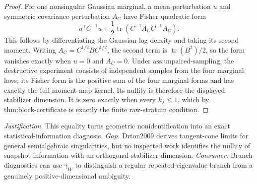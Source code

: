 \documentclass{article}
\begin{document}
\begin{proof}
For one nonsingular Gaussian marginal, a mean perturbation \(u\) and symmetric covariance perturbation \(A_C\) have Fisher quadratic form
\[
 u^{\mathsf T}C^{-1}u+
 \frac12\operatorname{tr}(C^{-1}A_CC^{-1}A_C).
\]
This follows by differentiating the Gaussian log density and taking its second moment.  Writing \(A_C=C^{1/2}BC^{1/2}\), the second term is \(\operatorname{tr}(B^2)/2\), so the form vanishes exactly when \(u=0\) and \(A_C=0\).  Under \(\text{ass:unpaired-sampling}\), the destructive experiment consists of independent samples from the four marginal laws; its Fisher form is the positive sum of the four marginal forms and has exactly the full moment-map kernel.  Its nullity is therefore the displayed stabilizer dimension.  It is zero exactly when every \(k_\lambda\leq1\), which by \(\text{thm:block-certificate}\) is exactly the finite raw-stratum condition.
\end{proof}
\par\smallskip\noindent \textit{Justification.} This equality turns geometric nonidentification into an exact statistical-information diagnosis. \textit{Gap.} Drton2009 derives tangent-cone limits for general semialgebraic singularities, but no inspected work identifies the nullity of snapshot information with an orthogonal stabilizer dimension. \textit{Consumer.} Branch diagnostics can use \(\gamma_W\) to distinguish a regular repeated-eigenvalue branch from a genuinely positive-dimensional ambiguity.
\end{document}
